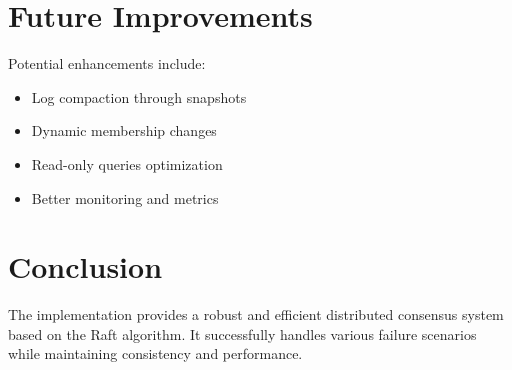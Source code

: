 \documentclass{article}
\begin{document}
\section{Future Improvements}
Potential enhancements include:
\begin{itemize}
    \item Log compaction through snapshots
    \item Dynamic membership changes
    \item Read-only queries optimization
    \item Better monitoring and metrics
\end{itemize}

\section{Conclusion}
The implementation provides a robust and efficient distributed consensus system based on the Raft algorithm. It successfully handles various failure scenarios while maintaining consistency and performance.
\end{document}
